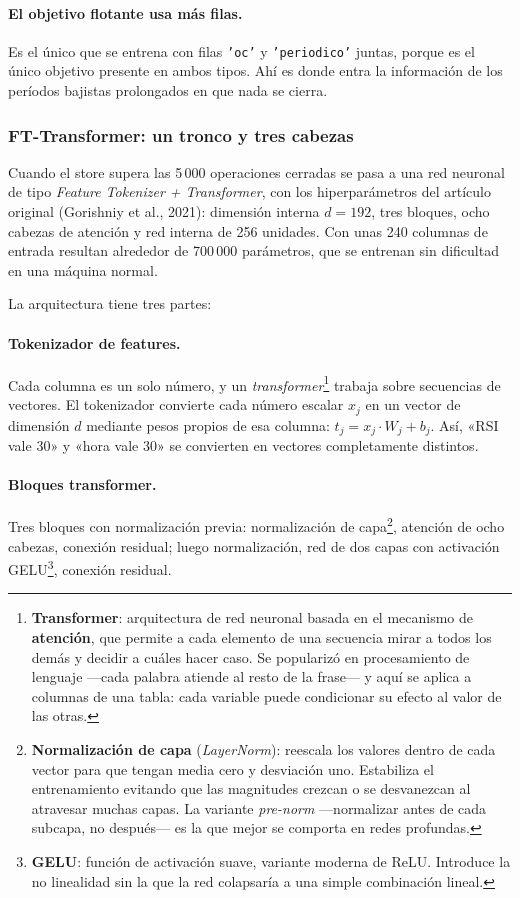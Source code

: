 \documentclass[11pt,a4paper]{article}
\newcommand{\code}[1]{\texttt{\small #1}}
\newcommand{\bigsep}{\par\vspace{3pt}}
\begin{document}
\paragraph{El objetivo flotante usa más filas.} Es el único que se entrena con filas
\code{'oc'} y \code{'periodico'} juntas, porque es el único objetivo presente en ambos tipos.
Ahí es donde entra la información de los períodos bajistas prolongados en que nada se cierra.

\subsubsection{FT-Transformer: un tronco y tres cabezas}

Cuando el store supera las 5\,000 operaciones cerradas se pasa a una red neuronal de tipo
\textit{Feature Tokenizer + Transformer}, con los hiperparámetros del artículo original
(Gorishniy et al., 2021): dimensión interna $d = 192$, tres bloques, ocho cabezas de atención
y red interna de 256 unidades. Con unas 240 columnas de entrada resultan alrededor de 700\,000
parámetros, que se entrenan sin dificultad en una máquina normal.

\bigsep
La arquitectura tiene tres partes:

\paragraph{Tokenizador de features.} Cada columna es un solo número, y un
\textit{transformer}\footnote{\textbf{Transformer}: arquitectura de red neuronal basada en el
mecanismo de \textbf{atención}, que permite a cada elemento de una secuencia mirar a todos los
demás y decidir a cuáles hacer caso. Se popularizó en procesamiento de lenguaje —cada palabra
atiende al resto de la frase— y aquí se aplica a columnas de una tabla: cada variable puede
condicionar su efecto al valor de las otras.} trabaja sobre secuencias de vectores. El
tokenizador convierte cada número escalar $x_j$ en un vector de dimensión $d$ mediante pesos
propios de esa columna: $t_j = x_j \cdot W_j + b_j$. Así, «RSI vale 30» y «hora vale 30» se
convierten en vectores completamente distintos.

\paragraph{Bloques transformer.} Tres bloques con normalización previa: normalización de
capa\footnote{\textbf{Normalización de capa} (\textit{LayerNorm}): reescala los valores dentro
de cada vector para que tengan media cero y desviación uno. Estabiliza el entrenamiento
evitando que las magnitudes crezcan o se desvanezcan al atravesar muchas capas. La variante
\textit{pre-norm} —normalizar antes de cada subcapa, no después— es la que mejor se comporta
en redes profundas.}, atención de ocho cabezas, conexión residual; luego normalización, red
de dos capas con activación GELU\footnote{\textbf{GELU}: función de activación suave, variante
moderna de ReLU. Introduce la no linealidad sin la que la red colapsaría a una simple
combinación lineal.}, conexión residual.
\end{document}
